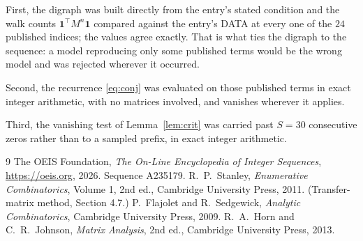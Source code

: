 \documentclass[11pt,a4paper]{article}
\theoremstyle{plain}
\theoremstyle{definition}
\begin{document}
First, the digraph was built directly from the entry's stated condition and the walk counts
$\mathbf{1}^{\!\top}M^{n}\mathbf{1}$ compared against the entry's DATA at every one of
the $24$ published indices; the values agree exactly. That is what ties the digraph to
the sequence: a model reproducing only some published terms would be the wrong model and
was rejected wherever it occurred.

Second, the recurrence \eqref{eq:conj} was evaluated on those published terms in exact
integer arithmetic, with no matrices involved, and vanishes wherever it applies.

Third, the vanishing test of Lemma~\ref{lem:crit} was carried past $S=30$ consecutive
zeros rather than to a sampled prefix, in exact integer arithmetic.

\begin{thebibliography}{9}
 The OEIS Foundation, \emph{The On-Line Encyclopedia of Integer
Sequences}, \url{https://oeis.org}, 2026. Sequence A235179.
 R.~P.~Stanley, \emph{Enumerative Combinatorics}, Volume 1, 2nd ed.,
Cambridge University Press, 2011. (Transfer-matrix method, Section 4.7.)
 P.~Flajolet and R.~Sedgewick, \emph{Analytic Combinatorics}, Cambridge
University Press, 2009.
 R.~A.~Horn and C.~R.~Johnson, \emph{Matrix Analysis}, 2nd ed., Cambridge
University Press, 2013.
\end{thebibliography}
\end{document}
